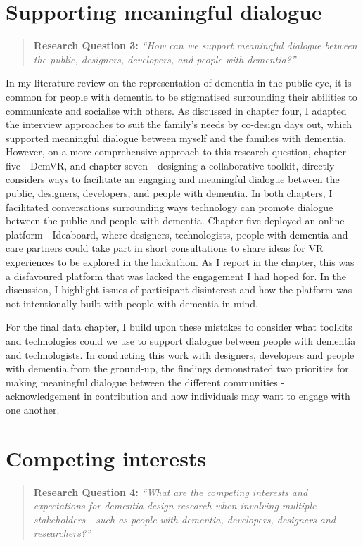 \section{Supporting meaningful dialogue}
\label{Discussion:RQ3}
\begin{quote}
\textbf{    Research Question 3:
}    
\textit{    “How can we support meaningful dialogue between the public, designers, developers, and people with dementia?”}
\end{quote}
In my literature review on the representation of dementia in the public eye, it is common for people with dementia to be stigmatised surrounding their abilities to communicate and socialise with others. As discussed in chapter four, I adapted the interview approaches to suit the family's needs by co-design days out, which supported meaningful dialogue between myself and the families with dementia. However, on a more comprehensive approach to this research question, chapter five - DemVR, and chapter seven - designing a collaborative toolkit, directly considers ways to facilitate an engaging and meaningful dialogue between the public, designers, developers, and people with dementia. In both chapters, I facilitated conversations surrounding ways technology can promote dialogue between the public and people with dementia. Chapter five deployed an online platform - Ideaboard, where designers, technologists, people with dementia and care partners could take part in short consultations to share ideas for VR experiences to be explored in the hackathon. As I report in the chapter, this was a disfavoured platform that was lacked the engagement I had hoped for. In the discussion, I highlight issues of participant disinterest and how the platform was not intentionally built with people with dementia in mind. 

For the final data chapter, I build upon these mistakes to consider what toolkits and technologies could we use to support dialogue between people with dementia and technologists. In conducting this work with designers, developers and people with dementia from the ground-up, the findings demonstrated two priorities for making meaningful dialogue between the different communities - acknowledgement in contribution and how individuals may want to engage with one another.

\section{Competing interests}
\label{Discussion:RQ4}
\begin{quote}
\textbf{    Research Question 4:
}    
\textit{    “What are the competing interests and expectations for dementia design research when involving multiple stakeholders - such as people with dementia, developers, designers and researchers?”}
\end{quote}


